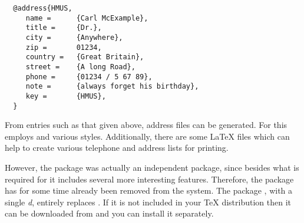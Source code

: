 \begin{lstlisting}
  @address{HMUS,
     name =      {Carl McExample},
     title =     {Dr.},
     city =      {Anywhere},
     zip =       01234,
     country =   {Great Britain},
     street =    {A long Road},
     phone =     {01234 / 5 67 89},
     note =      {always forget his birthday},
     key =       {HMUS},
  }
\end{lstlisting}

From entries such as that given above, address files can be generated.
For this  employs {\BibTeX} and various {\BibTeX}
styles.  Additionally, there are some {\LaTeX} files which can help to
create various telephone and address lists for printing.

However, the package  was actually an independent
package, since besides what is required for {\KOMAScript} it includes
several more interesting features.  Therefore, the package
 has for some time already been removed from the
{\KOMAScript} system. The package , with a single
\emph{d}, entirely replaces .  If it is not included
in your {\TeX} distribution then it can be downloaded from
\cite{package:adrconv} and you can install it separately.

